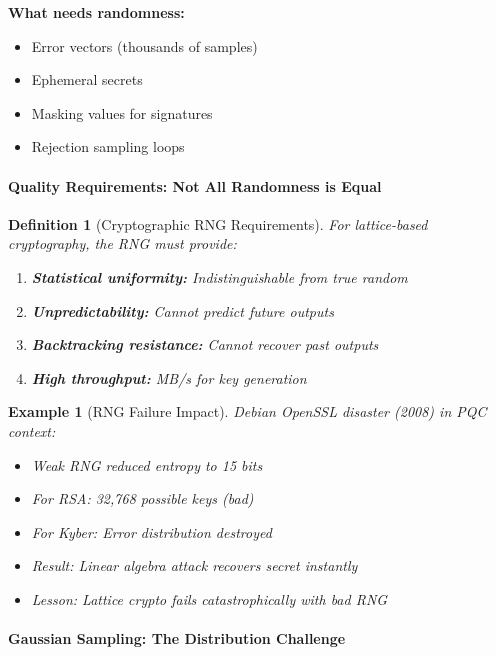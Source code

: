 \documentclass[11pt,a4paper]{article}
\newtheorem{definition}{Definition}
\newtheorem{example}{Example}
\begin{document}
\textbf{What needs randomness:}
\begin{itemize}
    \item Error vectors (thousands of samples)
    \item Ephemeral secrets
    \item Masking values for signatures
    \item Rejection sampling loops
\end{itemize}

\paragraph{Quality Requirements: Not All Randomness is Equal}

\begin{definition}[Cryptographic RNG Requirements]
For lattice-based cryptography, the RNG must provide:
\begin{enumerate}
    \item \textbf{Statistical uniformity:} Indistinguishable from true random
    \item \textbf{Unpredictability:} Cannot predict future outputs
    \item \textbf{Backtracking resistance:} Cannot recover past outputs
    \item \textbf{High throughput:} MB/s for key generation
\end{enumerate}
\end{definition}

\begin{example}[RNG Failure Impact]
Debian OpenSSL disaster (2008) in PQC context:
\begin{itemize}
    \item Weak RNG reduced entropy to 15 bits
    \item For RSA: 32,768 possible keys (bad)
    \item For Kyber: Error distribution destroyed
    \item Result: Linear algebra attack recovers secret instantly
    \item Lesson: Lattice crypto fails catastrophically with bad RNG
\end{itemize}
\end{example}

\paragraph{Gaussian Sampling: The Distribution Challenge}
\end{document}
